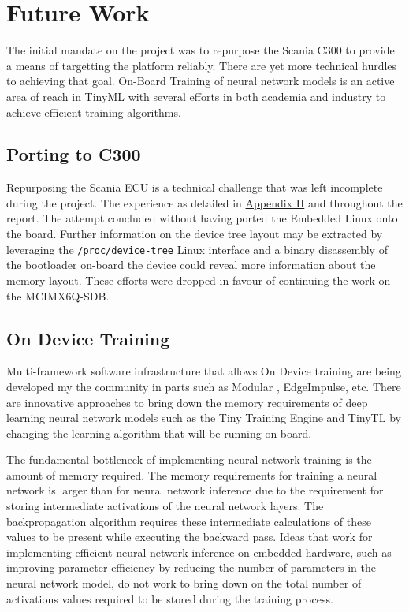 \section{Future Work}

The initial mandate on the project was to repurpose the Scania C300 to provide a means of targetting the platform reliably. There are yet more technical hurdles to achieving that goal. On-Board Training of neural network models is an active area of reach in TinyML with several efforts in both academia and industry to achieve efficient training algorithms.

\subsection{Porting to C300}

Repurposing the Scania ECU is a technical challenge that was left incomplete during the project. The experience as detailed in \hyperref[rtc-c300]{Appendix II} and throughout the report. The attempt concluded without having ported the Embedded Linux onto the board. Further information on the device tree layout may be extracted by leveraging the \texttt{/proc/device-tree} Linux interface and a binary disassembly of the bootloader on-board the device could reveal more information about the memory layout. These efforts were dropped in favour of continuing the work on the MCIMX6Q-SDB.

\subsection{On Device Training}

Multi-framework software infrastructure that allows On Device training are being developed my the community in parts such as Modular \cite{mojo}, EdgeImpulse, etc. There are innovative approaches to bring down the memory requirements of deep learning neural network models such as the Tiny Training Engine \cite{lin2022ondevice} and TinyTL \cite{cai2021tinytl} by changing the learning algorithm that will be running on-board.

The fundamental bottleneck of implementing neural network training is the amount of memory required. The memory requirements for training a neural network is larger than for neural network inference due to the requirement for storing intermediate activations of the neural network layers. The backpropagation algorithm requires these intermediate calculations of these values to be present while executing the backward pass. Ideas that work for implementing efficient neural network inference on embedded hardware, such as improving parameter efficiency by reducing the number of parameters in the neural network model, do not work to bring down on the total number of activations values required to be stored during the training process.
